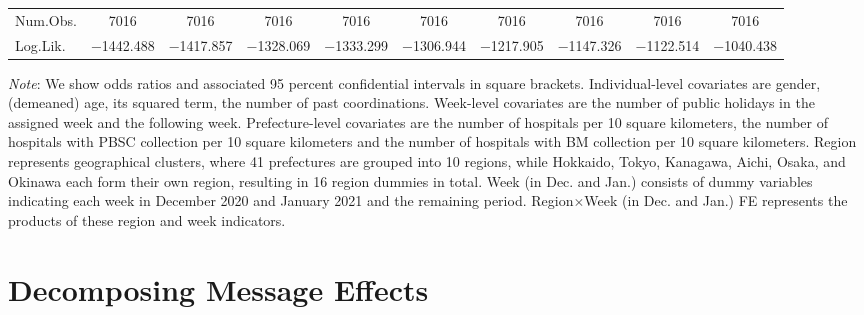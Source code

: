 \documentclass[12pt, a4paper]{article}
\begin{document}
\begin{landscape}
\begin{table}[H]
\begin{threeparttable}
\begin{tabular}[t]{lccccccccc}
Num.Obs. & \num{7016} & \num{7016} & \num{7016} & \num{7016} & \num{7016} & \num{7016} & \num{7016} & \num{7016} & \num{7016}\\
Log.Lik. & \num{-1442.488} & \num{-1417.857} & \num{-1328.069} & \num{-1333.299} & \num{-1306.944} & \num{-1217.905} & \num{-1147.326} & \num{-1122.514} & \num{-1040.438}\\
\bottomrule
\end{tabular}
\begin{tablenotes}
\item \emph{Note}: We show odds ratios and associated 95 percent confidential intervals in square brackets. Individual-level covariates are gender, (demeaned) age, its squared term, the number of past coordinations. Week-level covariates are the number of public holidays in the assigned week and the following week. Prefecture-level covariates are the number of hospitals per 10 square kilometers, the number of hospitals with PBSC collection per 10 square kilometers and the number of hospitals with BM collection per 10 square kilometers. Region represents geographical clusters, where 41 prefectures are grouped into 10 regions, while Hokkaido, Tokyo, Kanagawa, Aichi, Osaka, and Okinawa each form their own region, resulting in 16 region dummies in total. Week (in Dec. and Jan.) consists of dummy variables indicating each week in December 2020 and January 2021 and the remaining period. Region$\times$Week (in Dec. and Jan.) FE represents the products of these region and week indicators.
\end{tablenotes}
\end{threeparttable}
\end{table}
\end{landscape}

\clearpage

\hypertarget{decomposing-message-effects}{%
\section{Decomposing Message Effects}\label{decomposing-message-effects}}
\end{document}
